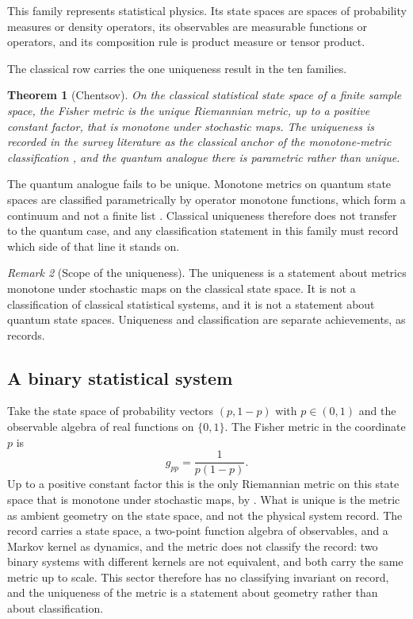 \documentclass[11pt,letterpaper]{article}
\newtheorem{theorem}{Theorem}[section]
\theoremstyle{definition}
\theoremstyle{remark}
\newtheorem{remark}[theorem]{Remark}
\begin{document}
This family represents statistical physics. Its state spaces are spaces of probability measures or density operators, its observables are measurable functions or operators, and its composition rule is product measure or tensor product.

The classical row carries the one uniqueness result in the ten families.

\begin{theorem}[Chentsov]
\label{thm:chentsov}
On the classical statistical state space of a finite sample space, the Fisher metric is the unique Riemannian metric, up to a positive constant factor, that is monotone under stochastic maps. The uniqueness is recorded in the survey literature as the classical anchor of the monotone-metric classification \cite{petz}, and the quantum analogue there is parametric rather than unique.
\end{theorem}

The quantum analogue fails to be unique. Monotone metrics on quantum state spaces are classified parametrically by operator monotone functions, which form a continuum and not a finite list \cite{petz}. Classical uniqueness therefore does not transfer to the quantum case, and any classification statement in this family must record which side of that line it stands on.

\begin{remark}[Scope of the uniqueness]
\label{rem:chentsov-scope}
The uniqueness is a statement about metrics monotone under stochastic maps on the classical state space. It is not a classification of classical statistical systems, and it is not a statement about quantum state spaces. Uniqueness and classification are separate achievements, as  records.
\end{remark}

\subsection{A binary statistical system}
\label{sec:binary}

Take the state space of probability vectors $(p, 1-p)$ with $p \in (0,1)$ and the observable algebra of real functions on $\{0, 1\}$. The Fisher metric in the coordinate $p$ is
\[
g_{pp} = \frac{1}{p(1-p)}.
\]
Up to a positive constant factor this is the only Riemannian metric on this state space that is monotone under stochastic maps, by . What is unique is the metric as ambient geometry on the state space, and not the physical system record. The record carries a state space, a two-point function algebra of observables, and a Markov kernel as dynamics, and the metric does not classify the record: two binary systems with different kernels are not equivalent, and both carry the same metric up to scale. This sector therefore has no classifying invariant on record, and the uniqueness of the metric is a statement about geometry rather than about classification.
\end{document}
